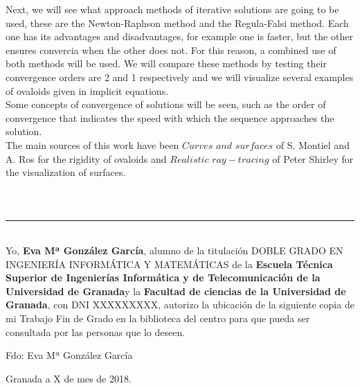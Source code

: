 Next, we will see what approach methods of iterative solutions are going to be used, these are the Newton-Raphson method and the Regula-Falsi method. Each one has its advantages and disadvantages, for example one is faster, but the other ensures convercia when the other does not. For this reason, a combined use of both methods will be used. We will compare these methods by testing their convergence orders are 2 and 1 respectively and we will visualize several examples of ovaloids given in implicit equations.
${ }$\\

Some concepts of convergence of solutions will be seen, such as the order of convergence that indicates the speed with which the sequence approaches the solution.
${ }$\\

The main sources of this work have been $Curves$ $and$ $surfaces$ of S. Montiel and A. Ros for the rigidity of ovaloids and $Realistic$ $ray-tracing$ of Peter Shirley for the visualization of surfaces.
${ }$\\


\vspace{0.7cm}
\\

\chapter*{}
\thispagestyle{empty}

\noindent\rule[-1ex]{\textwidth}{2pt}\\[4.5ex]

Yo, \textbf{Eva Mª González García}, alumno de la titulación DOBLE GRADO EN INGENIERÍA INFORMÁTICA Y MATEMÁTICAS de la \textbf{Escuela Técnica Superior
de Ingenierías Informática y de Telecomunicación de la Universidad de Granada}y la \textbf{Facultad de ciencias de la Universidad de Granada}, con DNI XXXXXXXXX, autorizo la
ubicación de la siguiente copia de mi Trabajo Fin de Grado en la biblioteca del centro para que pueda ser
consultada por las personas que lo deseen.

\vspace{6cm}

\noindent Fdo: Eva Mª González García

\vspace{2cm}

\begin{flushright}
Granada a X de mes de 2018.
\end{flushright}



